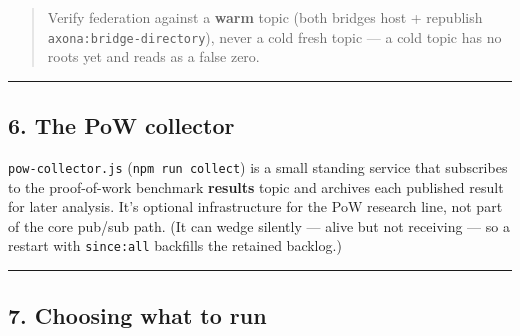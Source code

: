 \documentclass[
  nobib]{tufte-handout}
\begin{document}
\begin{quote}
Verify federation against a \textbf{warm} topic (both bridges host +
republish \texttt{axona:bridge-directory}), never a cold fresh topic ---
a cold topic has no roots yet and reads as a false zero.
\end{quote}

\begin{center}\rule{0.5\linewidth}{0.5pt}\end{center}

\subsection{6. The PoW collector}\label{the-pow-collector}

\texttt{pow-collector.js} (\texttt{npm\ run\ collect}) is a small
standing service that subscribes to the proof-of-work benchmark
\textbf{results} topic and archives each published result for later
analysis. It's optional infrastructure for the PoW research line, not
part of the core pub/sub path. (It can wedge silently --- alive but not
receiving --- so a restart with
\texttt{since:\textquotesingle{}all\textquotesingle{}} backfills the
retained backlog.)

\begin{center}\rule{0.5\linewidth}{0.5pt}\end{center}

\subsection{7. Choosing what to run}\label{choosing-what-to-run}
\end{document}
